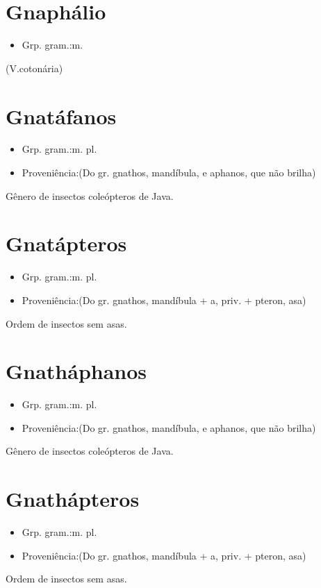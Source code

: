 \section{Gnaphálio}
\begin{itemize}
\item {Grp. gram.:m.}
\end{itemize}
(V.cotonária)
\section{Gnatáfanos}
\begin{itemize}
\item {Grp. gram.:m. pl.}
\end{itemize}
\begin{itemize}
\item {Proveniência:(Do gr. \textunderscore gnathos\textunderscore , mandíbula, e \textunderscore aphanos\textunderscore , que não brilha)}
\end{itemize}
Gênero de insectos coleópteros de Java.
\section{Gnatápteros}
\begin{itemize}
\item {Grp. gram.:m. pl.}
\end{itemize}
\begin{itemize}
\item {Proveniência:(Do gr. \textunderscore gnathos\textunderscore , mandíbula + \textunderscore a\textunderscore , priv. + \textunderscore pteron\textunderscore , asa)}
\end{itemize}
Ordem de insectos sem asas.
\section{Gnatháphanos}
\begin{itemize}
\item {Grp. gram.:m. pl.}
\end{itemize}
\begin{itemize}
\item {Proveniência:(Do gr. \textunderscore gnathos\textunderscore , mandíbula, e \textunderscore aphanos\textunderscore , que não brilha)}
\end{itemize}
Gênero de insectos coleópteros de Java.
\section{Gnathápteros}
\begin{itemize}
\item {Grp. gram.:m. pl.}
\end{itemize}
\begin{itemize}
\item {Proveniência:(Do gr. \textunderscore gnathos\textunderscore , mandíbula + \textunderscore a\textunderscore , priv. + \textunderscore pteron\textunderscore , asa)}
\end{itemize}
Ordem de insectos sem asas.
